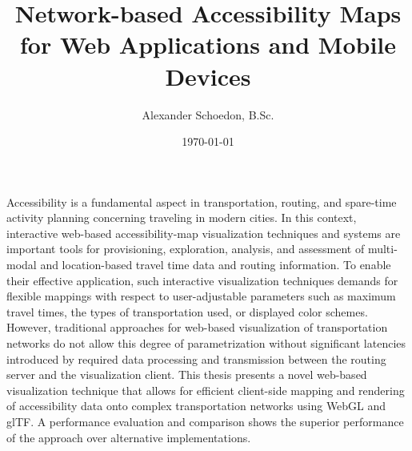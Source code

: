 \documentclass[english]{cgsthesis}
\title{
  \huge Network-based Accessibility Maps\\
  for Web Applications and Mobile Devices
}
\author{Alexander Schoedon, B.Sc.}
\date{\today}
\newcommand{\citesupplementary}[1]{\nocite{#1}\addtocategory{supplementary}{#1}}
\begin{document}
\frontmatter
\maketitle


\cleardoublepage
{}
Accessibility is a fundamental aspect in transportation, routing, and spare-time
activity planning concerning traveling in modern cities. In this context,
interactive web-based accessibility-map visualization techniques and systems
are important tools for provisioning, exploration, analysis, and assessment of
multi-modal and location-based travel time data and routing information. To
enable their effective application, such interactive visualization techniques
demands for flexible mappings with respect to user-adjustable parameters such
as maximum travel times, the types of transportation used, or displayed color
schemes. However, traditional approaches for web-based visualization of
transportation networks do not allow this degree of parametrization without
significant latencies introduced by required data processing and transmission
between the routing server and the visualization client. This thesis presents
a novel web-based visualization technique that allows for efficient client-side
mapping and rendering of accessibility data onto complex transportation
networks using WebGL and glTF. A performance evaluation and comparison shows
the superior performance of the approach over alternative implementations.


\cleardoublepage
{}
{}
\tableofcontents

\cleardoublepage
\listoffigures

\cleardoublepage
\listoftables

\cleardoublepage
\lstlistoflistings


\mainmatter










\printbibliography[
  title={References},
  category=cited,
  heading=bibintoc
]
\printbibliography[
  title={Further reading},
  category=supplementary,
  resetnumbers=true,
  heading=bibintoc
]
\nocite{*} %
\printbibliography[
  title={Uncited references},
  notcategory=cited,
  resetnumbers=true,
  heading=bibintoc
]


\appendix
\backmatter

\end{document}
